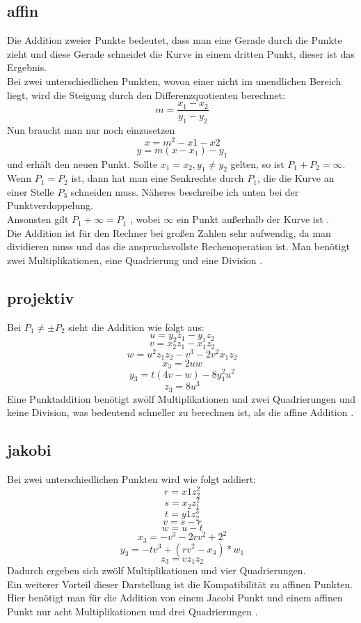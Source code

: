 \subsection{affin}
Die Addition zweier Punkte bedeutet, dass man eine Gerade durch die Punkte zieht und diese Gerade schneidet die Kurve in einem dritten Punkt, dieser ist das Ergebnis.\\
Bei zwei unterschiedlichen Punkten, wovon einer nicht im unendlichen Bereich liegt, wird die Steigung durch den Differenzquotienten berechnet: \[m = \frac{x_1-x_2}{y_1 - y_2}\]
Nun braucht man nur noch einzusetzen \[x = m^2 -x1 - x2\] \[y = m(x-x_1)-y_1\] und erhält den neuen Punkt. Sollte \(x_1 = x_2 , y_1 \neq y_2\) gelten, so ist \(P_1 + P_2 = \infty\).\\
Wenn \(P_1 = P_2\) ist, dann hat man eine Senkrechte durch \(P_1\), die die Kurve an einer Stelle \(P_3\) schneiden muss. Näheres beschreibe ich unten bei der Punktverdoppelung.\\

Ansonsten gilt \(P_1 + \infty = P_1\) , wobei \(\infty\) ein Punkt außerhalb der Kurve ist \cite{Washington2003}.\\
Die Addition ist für den Rechner bei großen Zahlen sehr aufwendig, da man dividieren muss und das die anspruchsvollste Rechenoperation ist. Man benötigt zwei Multiplikationen, eine Quadrierung und eine Division \cite{Washington2003}.
\subsection{projektiv}
Bei \(P_1 \neq \pm P_2\) sieht die Addition wie folgt aus:
\[u = y_2z_1 - y_1z_2\] \[v = x_2z_1 - x_1z_2\] \[w = u^2z_1z_2 - v^3 -2v^2x_1z_2\] \[x_3 = 2uw\] \[y_3 = t(4v -w)-8y_1^2u^2\] \[z_3 = 8u^3\]
Eine Punktaddition benötigt zwölf Multiplikationen und zwei Quadrierungen und keine Division, was bedeutend schneller zu berechnen ist, als die affine Addition  \cite{Washington2003}.
\newpage
\subsection{jakobi}
Bei zwei unterschiedlichen Punkten wird wie folgt addiert:
\[r = x1z_2^2\] \[s = x_2z_1^2\] \[t = y1z_2^3\] \[v = s - r\] \[w = u - t\] \[x_3 = -v^3 - 2rv^2 + 2^2\] \[y_3 = -tv^3 + (rv^2-x_3)*w_1\] \[z_3 = vz_1z_2\]
Dadurch ergeben sich zwölf Multiplikationen und vier Quadrierungen.\\
Ein weiterer Vorteil dieser Darstellung ist die Kompatibilität zu affinen Punkten. Hier benötigt man für die Addition von einem Jacobi Punkt und einem affinen Punkt nur acht Multiplikationen und drei Quadrierungen \cite{Washington2003}.
